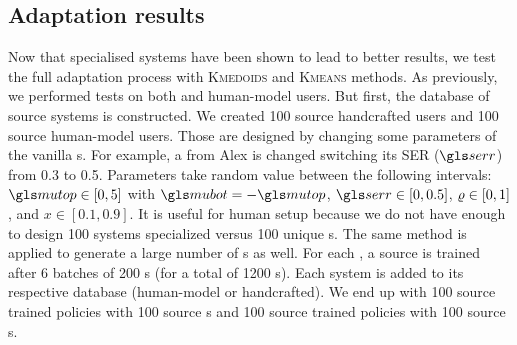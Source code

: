 \subsection{Adaptation results}
\label{subsection:adaptationprocess}

Now that specialised systems have been shown to lead to better results, we test the full adaptation process with \textsc{Kmedoids} and \textsc{Kmeans} methods.
As previously, we performed tests on both  and human-model users. But first, the database of source systems is constructed. We created 100 source handcrafted users and 100 source human-model users. Those are designed by changing some parameters of the vanilla s. For example, a  from Alex is changed switching its \gls{SER} ($\ser$) from 0.3 to 0.5. Parameters take random value between the following intervals: $\mutop\in[0,5]$ with $\mubot=-\mutop$, $\ser\in[0,0.5]$, $\varrho \in[0,1]$, and $x\in [0.1,0.9]$. It is useful for human setup because we do not have enough  to design 100 systems specialized versus 100 unique s. The same method is applied to generate a large number of s as well. For each , a source  is trained after 6 batches of 200 s (for a total of 1200 s). Each system is added to its respective database (human-model or handcrafted). We end up with 100 source trained policies with 100 source s  and 100 source trained policies with 100  source s.

